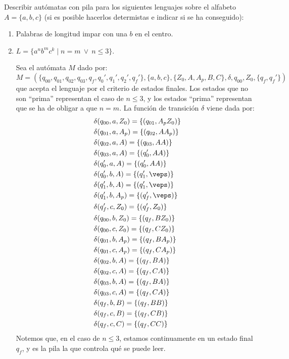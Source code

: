 \begin{ejercicio}\label{ej:1.5.23}
    Describir autómatas con pila para los siguientes lenguajes sobre el alfabeto $A = \{a,b,c\}$ (si es posible hacerlos determistas e indicar si se ha conseguido):
    \begin{enumerate}
        \item Palabras de longitud impar con una $b$ en el centro.
        
        \item $L = \{a^n b^m c^k \mid n = m\ \lor\ n \leq 3\}$.
        
        Sea el autómata $M$ dado por:
        \begin{equation*}
            M = (\{q_{00},q_{01},q_{02},q_{03},q_f, q_0',q_1',q_2',q_f'\},\{a,b,c\},\{Z_0,A,A_p,B,C\},\delta,q_{00},Z_0,\{q_f,q_f'\})
        \end{equation*}
        que acepta el lenguaje por el criterio de estados finales. Los estados que no son ``prima'' representan el caso de $n\leq 3$, y los estados ``prima'' representan que se ha de obligar a que $n=m$.
        La función de transición $\delta$ viene dada por:
        \begin{align*}
            &\delta(q_{00},a,Z_0) = \{(q_{01},A_pZ_0)\} \\
            &\delta(q_{01},a,A_p) = \{(q_{02},AA_p)\} \\
            &\delta(q_{02},a,A) = \{(q_{03},AA)\} \\
            &\delta(q_{03},a,A) = \{(q_{0}',AA)\} \\
            &\delta(q_{0}',a,A) = \{(q_{0}',AA)\} \\
            &\delta(q_{0}',b,A) = \{(q_1',\veps)\} \\
            &\delta(q_1',b,A) = \{(q_1',\veps)\} \\
            &\delta(q_1',b,A_p) = \{(q_f',\veps)\} \\
            &\delta(q_f',c,Z_0) = \{(q_f',Z_0)\}\\
            &\delta(q_{00},b,Z_0) = \{(q_f,BZ_0)\} \\
            &\delta(q_{00},c,Z_0) = \{(q_f,CZ_0)\} \\
            &\delta(q_{01},b,A_p) = \{(q_f,BA_p)\} \\
            &\delta(q_{01},c,A_p) = \{(q_f,CA_p)\} \\
            &\delta(q_{02},b,A) = \{(q_f,BA)\} \\
            &\delta(q_{02},c,A) = \{(q_f,CA)\} \\
            &\delta(q_{03},b,A) = \{(q_f,BA)\} \\
            &\delta(q_{03},c,A) = \{(q_f,CA)\} \\
            &\delta(q_f,b,B) = \{(q_f,BB)\} \\
            &\delta(q_f,c,B) = \{(q_f,CB)\} \\
            &\delta(q_f,c,C) = \{(q_f,CC)\}
        \end{align*}
        Notemos que, en el caso de $n\leq 3$, estamos continuamente en un estado final $q_f$, y es la pila la que controla qué se puede leer.


\end{enumerate}
\end{ejercicio}
